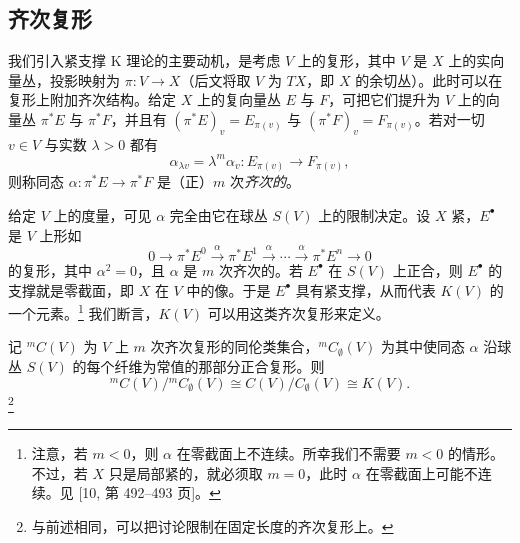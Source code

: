 \subsection{齐次复形}

我们引入紧支撑 K 理论的主要动机，是考虑 $V$ 上的复形，其中 $V$ 是 $X$ 上的实向量丛，投影映射为 $\pi:V\to X$（后文将取 $V$ 为 $TX$，即 $X$ 的余切丛）。此时可以在复形上附加齐次结构。给定 $X$ 上的复向量丛 $E$ 与 $F$，可把它们提升为 $V$ 上的向量丛 $\pi^*E$ 与 $\pi^*F$，并且有 $(\pi^*E)_v=E_{\pi(v)}$ 与 $(\pi^*F)_v=F_{\pi(v)}$。若对一切 $v\in V$ 与实数 $\lambda>0$ 都有
\[
\alpha_{\lambda v}=\lambda^m\alpha_v:E_{\pi(v)}\to F_{\pi(v)},
\]
则称同态 $\alpha:\pi^*E\to\pi^*F$ 是（正）$m$ 次\emph{齐次的}。

给定 $V$ 上的度量，可见 $\alpha$ 完全由它在球丛 $S(V)$ 上的限制决定。设 $X$ 紧，$E^\bullet$ 是 $V$ 上形如
\[
0\to\pi^*E^0\xrightarrow{\alpha}\pi^*E^1\xrightarrow{\alpha}\cdots
\xrightarrow{\alpha}\pi^*E^n\to0
\]
的复形，其中 $\alpha^2=0$，且 $\alpha$ 是 $m$ 次齐次的。若 $E^\bullet$ 在 $S(V)$ 上正合，则 $E^\bullet$ 的支撑就是零截面，即 $X$ 在 $V$ 中的像。于是 $E^\bullet$ 具有紧支撑，从而代表 $K(V)$ 的一个元素。\footnote{注意，若 $m<0$，则 $\alpha$ 在零截面上不连续。所幸我们不需要 $m<0$ 的情形。不过，若 $X$ 只是局部紧的，就必须取 $m=0$，此时 $\alpha$ 在零截面上可能不连续。见 [10, 第 492--493 页]。} 我们断言，$K(V)$ 可以用这类齐次复形来定义。


\begin{claim}
记 ${}^{m}C(V)$ 为 $V$ 上 $m$ 次齐次复形的同伦类集合，${}^{m}C_\emptyset(V)$ 为其中使同态 $\alpha$ 沿球丛 $S(V)$ 的每个纤维为常值的那部分正合复形。则
\[
{}^{m}C(V)/{}^{m}C_\emptyset(V)\cong C(V)/C_\emptyset(V)\cong K(V).
\]
\footnote{与前述相同，可以把讨论限制在固定长度的齐次复形上。}
\end{claim}

